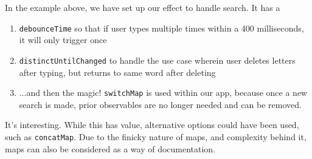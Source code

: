 In the example above, we have set up our effect to handle search. It has a 
\begin{enumerate}
  \item \lstinline{debounceTime} so that if user types multiple times within
  a 400 milliseconds, it will only trigger once
  \item \lstinline{distinctUntilChanged} to handle the use case wherein user 
  deletes letters after typing, but returns to same word after deleting
  \item ...and then the magic! \lstinline{switchMap} is used within our app,
  because once a new search is made, prior observables are no longer needed 
  and can be removed. 
\end{enumerate}

It's interesting. While this has value, alternative options could have been 
used, such as \lstinline{concatMap}. Due to the finicky nature of maps, and 
complexity behind it, maps can also be considered as a way of documentation. 
